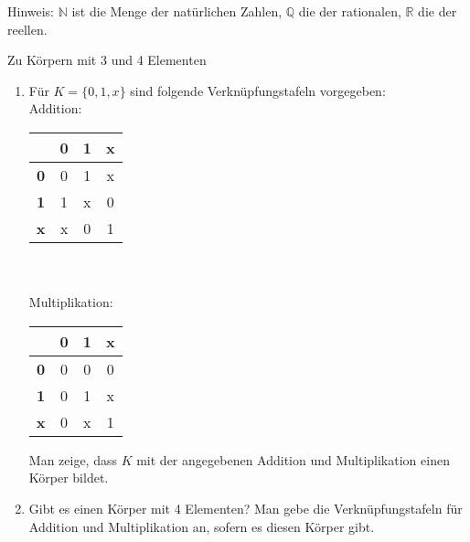 \documentclass{uebblatt}
\begin{document}

Hinweis: $\mathbb{N}$ ist die Menge der natürlichen Zahlen, $\mathbb{Q}$ die der rationalen, $\mathbb{R}$ die der reellen.

\begin{aufgabe}{Zu Körpern mit 3 und 4 Elementen}
\begin{enumerate}
\item Für $K = \{0, 1, x\}$ sind folgende Verknüpfungstafeln vorgegeben:\\
Addition:\\
\begin{tabular} {|c|c|c|c|}
\hline
 & \textbf0 & \textbf1 & \textbf{x}\\
\hline
\textbf0 & 0 & 1 & x\\
\hline
\textbf1 & 1 & x & 0\\
\hline
\textbf{x} & x & 0 & 1\\
\hline
\end{tabular} \\
\\
Multiplikation:\\
\begin{tabular} {|c|c|c|c|}
\hline
 & \textbf0 & \textbf1 & \textbf{x}\\
\hline
\textbf0 & 0 & 0 & 0\\
\hline
\textbf1 & 0 & 1 & x\\
\hline
\textbf{x} & 0 & x & 1\\
\hline
\end{tabular} \bigbreak

Man zeige, dass $K$ mit der angegebenen Addition und Multiplikation einen Körper bildet.
\item Gibt es einen Körper mit 4 Elementen? Man gebe die Verknüpfungstafeln für Addition und Multiplikation an, sofern es diesen Körper gibt.
\end{enumerate}
\end{aufgabe}
\end{document}
